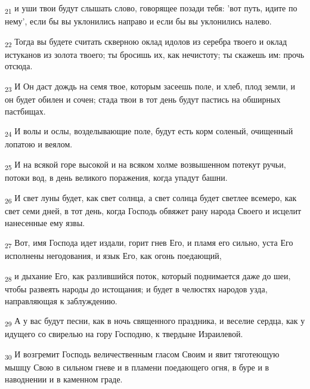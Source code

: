 \begin{tcolorbox}
\textsubscript{21} и уши твои будут слышать слово, говорящее позади тебя: 'вот путь, идите по нему', если бы вы уклонились направо и если бы вы уклонились налево.
\end{tcolorbox}
\begin{tcolorbox}
\textsubscript{22} Тогда вы будете считать скверною оклад идолов из серебра твоего и оклад истуканов из золота твоего; ты бросишь их, как нечистоту; ты скажешь им: прочь отсюда.
\end{tcolorbox}
\begin{tcolorbox}
\textsubscript{23} И Он даст дождь на семя твое, которым засеешь поле, и хлеб, плод земли, и он будет обилен и сочен; стада твои в тот день будут пастись на обширных пастбищах.
\end{tcolorbox}
\begin{tcolorbox}
\textsubscript{24} И волы и ослы, возделывающие поле, будут есть корм соленый, очищенный лопатою и веялом.
\end{tcolorbox}
\begin{tcolorbox}
\textsubscript{25} И на всякой горе высокой и на всяком холме возвышенном потекут ручьи, потоки вод, в день великого поражения, когда упадут башни.
\end{tcolorbox}
\begin{tcolorbox}
\textsubscript{26} И свет луны будет, как свет солнца, а свет солнца будет светлее всемеро, как свет семи дней, в тот день, когда Господь обвяжет рану народа Своего и исцелит нанесенные ему язвы.
\end{tcolorbox}
\begin{tcolorbox}
\textsubscript{27} Вот, имя Господа идет издали, горит гнев Его, и пламя его сильно, уста Его исполнены негодования, и язык Его, как огонь поедающий,
\end{tcolorbox}
\begin{tcolorbox}
\textsubscript{28} и дыхание Его, как разлившийся поток, который поднимается даже до шеи, чтобы развеять народы до истощания; и будет в челюстях народов узда, направляющая к заблуждению.
\end{tcolorbox}
\begin{tcolorbox}
\textsubscript{29} А у вас будут песни, как в ночь священного праздника, и веселие сердца, как у идущего со свирелью на гору Господню, к твердыне Израилевой.
\end{tcolorbox}
\begin{tcolorbox}
\textsubscript{30} И возгремит Господь величественным гласом Своим и явит тяготеющую мышцу Свою в сильном гневе и в пламени поедающего огня, в буре и в наводнении и в каменном граде.
\end{tcolorbox}
